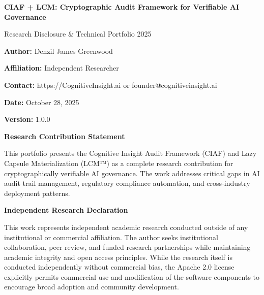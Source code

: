 \documentclass[12pt,a4paper]{article}
\begin{document}
\begin{titlepage}
\centering
\vspace*{1cm}

{\Huge\bfseries\color{ciafdarkblue} CIAF + LCM: Cryptographic Audit Framework for Verifiable AI Governance\par}
\vspace{0.5cm}
{\LARGE\color{ciafblue} Research Disclosure \& Technical Portfolio 2025\par}
\vspace{2cm}

{\Large\textbf{Author:} Denzil James Greenwood\par}
\vspace{0.5cm}
{\large\textbf{Affiliation:} Independent Researcher\par}
\vspace{0.5cm}
{\large\textbf{Contact:} https://CognitiveInsight.ai or founder@cognitiveinsight.ai \par}
\vspace{0.5cm}
{\large\textbf{Date:} October 28, 2025\par}
\vspace{0.5cm}
{\large\textbf{Version:} 1.0.0\par}

\vspace{2cm}

\begin{executivebox}
\textbf{Research Contribution Statement}

This portfolio presents the Cognitive Insight Audit Framework (CIAF) and Lazy Capsule Materialization (LCM™) as a complete research contribution for cryptographically verifiable AI governance. The work addresses critical gaps in AI audit trail management, regulatory compliance automation, and cross-industry deployment patterns.

\vspace{0.5cm}

\textbf{Independent Research Declaration} 

This work represents independent academic research conducted outside of any institutional or commercial affiliation. The author seeks institutional collaboration, peer review, and funded research partnerships while maintaining academic integrity and open access principles. While the research itself is conducted independently without commercial bias, the Apache 2.0 license explicitly permits commercial use and modification of the software components to encourage broad adoption and community development.
\end{executivebox}


\end{titlepage}
\end{document}
